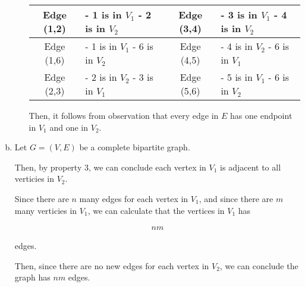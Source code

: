 \documentclass[12pt]{article}
\begin{document}
\begin{enumerate}[a.]
\begin{mdframed}
\begin{enumerate}[1.]
\begin{mdframed}
            \begin{tabular}{|c|p{3cm}|c|p{3cm}|}
                \hline
                Edge (1,2) & - 1 is in $V_1$ \newline - 2 is in $V_2$ & Edge (3,4) & - 3 is in $V_1$ \newline - 4 is in $V_2$\\
                \hline
                Edge (1,6) & - 1 is in $V_1$ \newline - 6 is in $V_2$ & Edge (4,5) & - 4 is in $V_2$ \newline - 6 is in $V_1$\\
                \hline
                Edge (2,3) & - 2 is in $V_2$ \newline - 3 is in $V_1$ & Edge (5,6) & - 5 is in $V_1$ \newline - 6 is in $V_2$\\
                \hline
            \end{tabular}

            \bigskip

            Then, it follows from observation that every edge in $E$ has
            one endpoint in $V_1$ and one in $V_2$.

            \end{mdframed}

        \end{enumerate}

    \end{mdframed}

    \item

    Let $G = (V,E)$ be a complete bipartite graph.

    \bigskip

    Then, by property 3, we can conclude each vertex in $V_1$ is adjacent to all
    verticies in $V_2$.

    \bigskip

    Since there are $n$ many edges for each vertex in $V_1$, and since there are $m$
    many verticies in $V_1$, we can calculate that the vertices in $V_1$ has

    \setcounter{equation}{0}
    \begin{align}
        nm
    \end{align}

    edges.

    \bigskip

    Then, since there are no new edges for each vertex in $V_2$, we can conclude
    the graph has $nm$ edges.


\end{enumerate}
\end{document}
